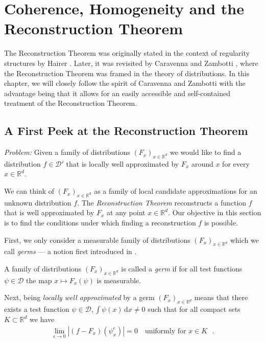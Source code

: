 

\chapter{Coherence, Homogeneity and the Reconstruction Theorem}\label{chapter:reconstruction}

The Reconstruction Theorem was originally stated in the context of regularity structures by Hairer \cite{hairer2014theory}. Later, it was revisited by Caravenna and Zambotti \cite{caravenna2021hairer}, where the Reconstruction Theorem was framed in the theory of distributions. In this chapter, we will closely follow the spirit of Caravenna and Zambotti with the advantage being that it allows for an easily accessible and self-contained treatment of the Reconstruction Theorem.

\section{A First Peek at the Reconstruction Theorem}\label{chapter:first-peek-at-reconstruction}

\emph{Problem:} Given a family of distributions $(F_x)_{x \in \mathbb{R}^d}$ we would like to find a distribution $f \in \mathcal{D'}$ that is locally well approximated by $F_x$ around $x$ for every $x \in \mathbb{R}^d$. 

\vspace{0.5cm}

We can think of $(F_x)_{x \in \mathbb{R}^d}$ as a family of local candidate approximations for an unknown distribution $f$. The \emph{Reconstruction Theorem} reconstructs a function $f$ that is well approximated by $F_x$ at any point $x \in \mathbb{R}^d$. Our objective in this section is to find the conditions under which finding a reconstruction $f$ is possible. 

First, we only consider a measurable family of distributions $(F_x)_{x \in \mathbb{R}^d}$ which we call \emph{germs} --- a notion first introduced in \cite{caravenna2021hairer}.

\begin{definition}[Germ]
    A family of distributions $(F_x)_{x \in \mathbb{R}^d}$ is called a \emph{germ} if for all test functions $\psi \in \mathcal{D}$ the map $x \mapsto F_x(\psi)$ is measurable.
\end{definition}

Next, being \emph{locally well approximated} by a germ $(F_x)_{x \in \mathbb{R}^d}$ means that there exists a test function $\psi \in \mathcal{D}, \int \psi(x)\, \mathrm{d}x \neq 0$ such that for all compact sets $K \subset \mathbb{R}^d$ we have 
\begin{align}\label{peek:well-approximated}
    \lim_{\epsilon \to 0} |(f - F_x)(\psi^\epsilon_x)| = 0 \quad \text{uniformly for $x \in K$ }.
\end{align} 

